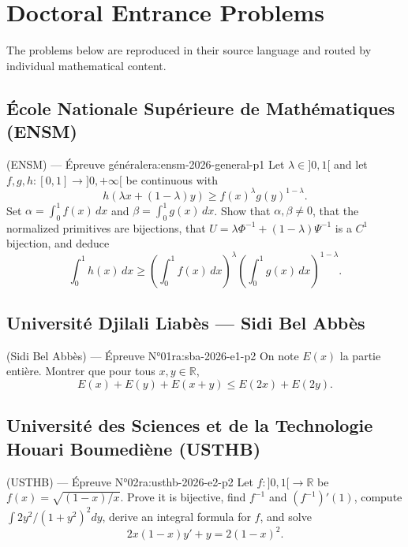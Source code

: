 \chapter{Doctoral Entrance Problems}
\label{ch:problems}

The problems below are reproduced in their source language and routed by individual mathematical content.
\newpage

\section{École Nationale Supérieure de Mathématiques (ENSM)}
\begin{problem}{(ENSM) — Épreuve générale}{ra:ensm-2026-general-p1}
Let $\lambda\in]0,1[$ and let $f,g,h:[0,1]\to]0,+\infty[$ be continuous with
$$h(\lambda x+(1-\lambda)y)\ge f(x)^\lambda g(y)^{1-\lambda}.$$
Set $\alpha=\int_0^1f(x)\,dx$ and $\beta=\int_0^1g(x)\,dx$. Show that $\alpha,\beta\ne0$, that the normalized primitives are bijections, that $U=\lambda\Phi^{-1}+(1-\lambda)\Psi^{-1}$ is a $C^1$ bijection, and deduce
$$\int_0^1h(x)\,dx\ge\left(\int_0^1f(x)\,dx\right)^\lambda\left(\int_0^1g(x)\,dx\right)^{1-\lambda}.$$
\end{problem}
\newpage
\section{Université Djilali Liabès --- Sidi Bel Abbès}
\begin{problem}{(Sidi Bel Abbès) — Épreuve N°01}{ra:sba-2026-e1-p2}
On note $E(x)$ la partie entière. Montrer que pour tous $x,y\in\mathbb R$,
$$E(x)+E(y)+E(x+y)\le E(2x)+E(2y).$$
\end{problem}
\newpage
\section{Université des Sciences et de la Technologie Houari Boumediène (USTHB)}
\begin{problem}{(USTHB) — Épreuve N°02}{ra:usthb-2026-e2-p2}
Let $f:]0,1[\to\mathbb R$ be $f(x)=\sqrt{(1-x)/x}$. Prove it is bijective, find $f^{-1}$ and $(f^{-1})'(1)$, compute $\int 2y^2/(1+y^2)^2dy$, derive an integral formula for $f$, and solve
$$2x(1-x)y'+y=2(1-x)^2.$$
\end{problem}
\newpage

